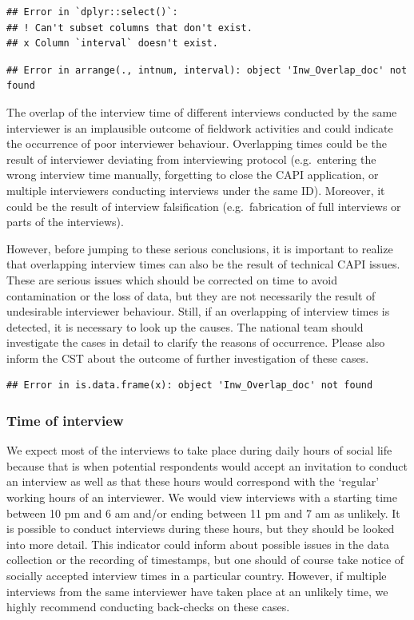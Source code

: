 \documentclass[
  11pt,
  a4paperpaper,
]{article}
\begin{document}
\begin{verbatim}
## Error in `dplyr::select()`:
## ! Can't subset columns that don't exist.
## x Column `interval` doesn't exist.
\end{verbatim}

\begin{verbatim}
## Error in arrange(., intnum, interval): object 'Inw_Overlap_doc' not found
\end{verbatim}

The overlap of the interview time of different interviews conducted by
the same interviewer is an implausible outcome of fieldwork activities
and could indicate the occurrence of poor interviewer behaviour.
Overlapping times could be the result of interviewer deviating from
interviewing protocol (e.g.~entering the wrong interview time manually,
forgetting to close the CAPI application, or multiple interviewers
conducting interviews under the same ID). Moreover, it could be the
result of interview falsification (e.g.~fabrication of full interviews
or parts of the interviews).

However, before jumping to these serious conclusions, it is important to
realize that overlapping interview times can also be the result of
technical CAPI issues. These are serious issues which should be
corrected on time to avoid contamination or the loss of data, but they
are not necessarily the result of undesirable interviewer behaviour.
Still, if an overlapping of interview times is detected, it is necessary
to look up the causes. The national team should investigate the cases in
detail to clarify the reasons of occurrence. Please also inform the CST
about the outcome of further investigation of these cases.

\begin{verbatim}
## Error in is.data.frame(x): object 'Inw_Overlap_doc' not found
\end{verbatim}

\newpage

\hypertarget{sec:time}{%
\subsubsection{Time of interview}\label{sec:time}}

We expect most of the interviews to take place during daily hours of
social life because that is when potential respondents would accept an
invitation to conduct an interview as well as that these hours would
correspond with the `regular' working hours of an interviewer. We would
view interviews with a starting time between 10 pm and 6 am and/or
ending between 11 pm and 7 am as unlikely. It is possible to conduct
interviews during these hours, but they should be looked into more
detail. This indicator could inform about possible issues in the data
collection or the recording of timestamps, but one should of course take
notice of socially accepted interview times in a particular country.
However, if multiple interviews from the same interviewer have taken
place at an unlikely time, we highly recommend conducting back-checks on
these cases.
\end{document}
